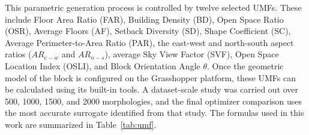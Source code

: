 \documentclass[final,3p,times]{elsarticle}
\begin{document}
This parametric generation process is controlled by twelve selected UMFs. These include Floor Area Ratio (FAR), Building Density (BD), Open Space Ratio (OSR), Average Floors (AF), Setback Diversity (SD), Shape Coefficient (SC), Average Perimeter-to-Area Ratio (PAR), the east-west and north-south aspect ratios ($AR_{e-w}$ and $AR_{n-s}$), average Sky View Factor (SVF), Open Space Location Index (OSLI), and Block Orientation Angle $\theta$. Once the geometric model of the block is configured on the Grasshopper platform, these UMFs can be calculated using its built-in tools. A dataset-scale study was carried out over 500, 1000, 1500, and 2000 morphologies, and the final optimizer comparison uses the most accurate surrogate identified from that study. The formulas used in this work are summarized in Table~\ref{tab:umf}.
\end{document}
